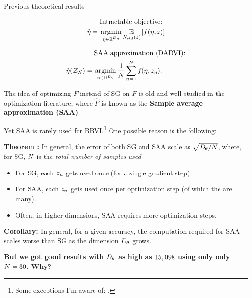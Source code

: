 \documentclass[8pt]{beamer}\usepackage[]{graphicx}\usepackage[]{color}
\begin{document}
\begin{frame}[t]{Previous theoretical results}
\vspace{-3em}
\begin{minipage}[t]{0.48\textwidth}
    \begin{align*}
        &\text{Intractable objective:} 
        \\ \etastar %
            ={}& 
            \argmin_{\eta \in \etadom} \expect{\normz}{f(\eta, \z)}
    \end{align*}    
\end{minipage}
\begin{minipage}[t]{0.48\textwidth}
    \begin{align*}
        &\text{SAA approximation (DADVI):} 
        \\ \etahat(\Z) %
            ={}&  \argmin_{\eta \in \etadom} \meann f(\eta, \z_n).
    \end{align*}
\end{minipage}

\hrulefill

The idea of optimizing $\hat{F}$ instead of SG on $F$ is old and
well-studied in the optimization literature, where $\hat{F}$
is known as the \textbf{Sample average approximation (SAA)}.

Yet SAA is rarely used for BBVI.\footnote{Some exceptions I'm aware of:
\citet{giordano:2018:covariances,giordano:2022:bnp,wycoff:2022:sparsebayesianlasso,burroni:2023:saabbvi}.}
One possible reason is the following:


\noindent
\textbf{Theorem \citep{nemirovski:2009:sgdvsfixed}:}
In general, the error of both SG and SAA scale as
$\sqrt{{D_{\theta}} / N}$,
where, for SG, $N$ is the \textit{total number of samples used}.

\pause
%
\begin{itemize}
\item For SG, each $z_n$ gets used once (for a single gradient step)
\item For SAA, each $z_n$ gets used once per optimization step
(of which the are many).
\item Often, in higher dimensions, SAA requires more optimization steps.
\end{itemize}
%


\noindent
\textbf{Corollary: \citep{kim:2015:guidetosaa}}
In general, for a given accuracy, the computation required for SAA 
scales worse than SG as the dimension ${D_{\theta}}$ grows.

\pause
\textbf{
But we got good results with ${D_{\theta}}$ as
high as $15,098$ using only
only $N = 30$.  Why?}


\end{frame}
\end{document}
